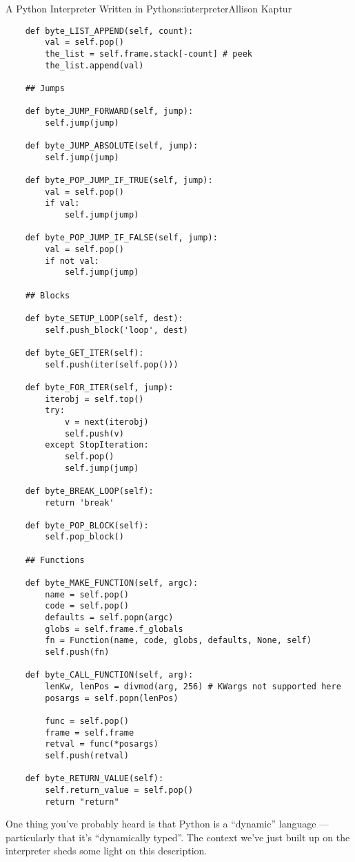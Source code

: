 \begin{aosachapter}{A Python Interpreter Written in Python}{s:interpreter}{Allison Kaptur}
\begin{verbatim}
    def byte_LIST_APPEND(self, count):
        val = self.pop()
        the_list = self.frame.stack[-count] # peek
        the_list.append(val)

    ## Jumps

    def byte_JUMP_FORWARD(self, jump):
        self.jump(jump)

    def byte_JUMP_ABSOLUTE(self, jump):
        self.jump(jump)

    def byte_POP_JUMP_IF_TRUE(self, jump):
        val = self.pop()
        if val:
            self.jump(jump)

    def byte_POP_JUMP_IF_FALSE(self, jump):
        val = self.pop()
        if not val:
            self.jump(jump)

    ## Blocks

    def byte_SETUP_LOOP(self, dest):
        self.push_block('loop', dest)

    def byte_GET_ITER(self):
        self.push(iter(self.pop()))

    def byte_FOR_ITER(self, jump):
        iterobj = self.top()
        try:
            v = next(iterobj)
            self.push(v)
        except StopIteration:
            self.pop()
            self.jump(jump)

    def byte_BREAK_LOOP(self):
        return 'break'

    def byte_POP_BLOCK(self):
        self.pop_block()

    ## Functions

    def byte_MAKE_FUNCTION(self, argc):
        name = self.pop()
        code = self.pop()
        defaults = self.popn(argc)
        globs = self.frame.f_globals
        fn = Function(name, code, globs, defaults, None, self)
        self.push(fn)

    def byte_CALL_FUNCTION(self, arg):
        lenKw, lenPos = divmod(arg, 256) # KWargs not supported here
        posargs = self.popn(lenPos)

        func = self.pop()
        frame = self.frame
        retval = func(*posargs)
        self.push(retval)

    def byte_RETURN_VALUE(self):
        self.return_value = self.pop()
        return "return"
\end{verbatim}

\label{dynamic-typing-what-the-compiler-doesnt-know}

One thing you've probably heard is that Python is a ``dynamic'' language
--- particularly that it's ``dynamically typed''. The context we've just
built up on the interpreter sheds some light on this description.


\end{aosachapter}
